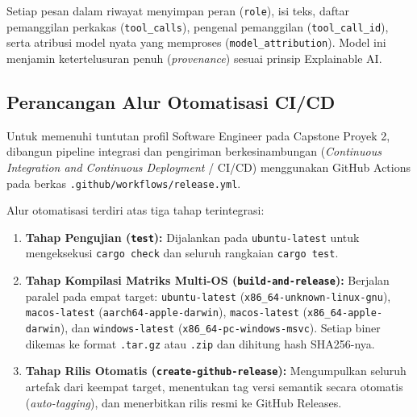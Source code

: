 Setiap pesan dalam riwayat menyimpan peran (\texttt{role}), isi teks, daftar pemanggilan perkakas (\texttt{tool\_calls}), pengenal pemanggilan (\texttt{tool\_call\_id}), serta atribusi model nyata yang memproses (\texttt{model\_attribution}). Model ini menjamin ketertelusuran penuh (\textit{provenance}) sesuai prinsip Explainable AI.

\subsection{Perancangan Alur Otomatisasi CI/CD}
Untuk memenuhi tuntutan profil Software Engineer pada Capstone Proyek 2, dibangun pipeline integrasi dan pengiriman berkesinambungan (\textit{Continuous Integration and Continuous Deployment} / CI/CD) menggunakan GitHub Actions pada berkas \texttt{.github/workflows/release.yml}. 

Alur otomatisasi terdiri atas tiga tahap terintegrasi:
\begin{enumerate}
    \item \textbf{Tahap Pengujian (\texttt{test}):} Dijalankan pada \texttt{ubuntu-latest} untuk mengeksekusi \texttt{cargo check} dan seluruh rangkaian \texttt{cargo test}.
    \item \textbf{Tahap Kompilasi Matriks Multi-OS (\texttt{build-and-release}):} Berjalan paralel pada empat target: \texttt{ubuntu-latest} (\texttt{x86\_64-unknown-linux-gnu}), \texttt{macos-latest} (\texttt{aarch64-apple-darwin}), \texttt{macos-latest} (\texttt{x86\_64-apple-darwin}), dan \texttt{windows-latest} (\texttt{x86\_64-pc-windows-msvc}). Setiap biner dikemas ke format \texttt{.tar.gz} atau \texttt{.zip} dan dihitung hash SHA256-nya.
    \item \textbf{Tahap Rilis Otomatis (\texttt{create-github-release}):} Mengumpulkan seluruh artefak dari keempat target, menentukan tag versi semantik secara otomatis (\textit{auto-tagging}), dan menerbitkan rilis resmi ke GitHub Releases.
\end{enumerate}
